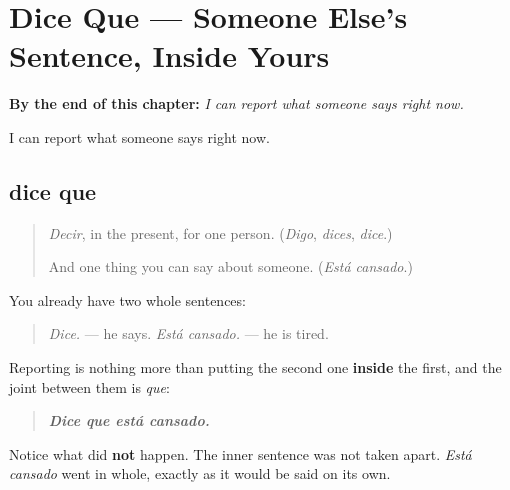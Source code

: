 
\chapter{Dice Que --- Someone Else's Sentence, Inside Yours}
\label{ch:dice-que}

\begin{chapteropening}
\textbf{By the end of this chapter:} \emph{I can report what someone says right now.}

I can report what someone says right now.
\end{chapteropening}

\section[dice que]{dice que}

\label{lesson:ES-C57-dice-que}



\begin{quote}
\emph{Decir}, in the present, for one person. (\emph{Digo}, \emph{dices}, \emph{dice}.)

And one thing you can say about someone. (\emph{Está cansado}.)
\end{quote}

\begin{grammarlens}[title={Grammar Lens: one sentence inside another}]
You already have two whole sentences:

\begin{quote}
\emph{Dice.} — he says. \emph{Está cansado.} — he is tired.
\end{quote}

Reporting is nothing more than putting the second one \textbf{inside} the first, and the joint between them is \emph{que}:

\begin{quote}
\emph{\textbf{Dice que está cansado.}}
\end{quote}

Notice what did \textbf{not} happen. The inner sentence was not taken apart. \emph{Está cansado} went in whole, exactly as it would be said on its own.
\end{grammarlens}

